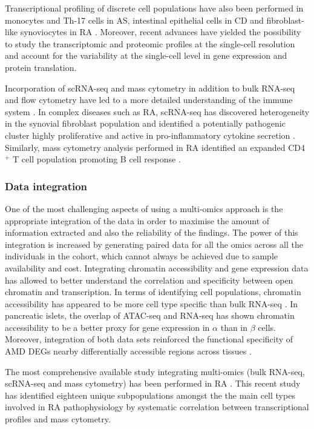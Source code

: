 Transcriptional profiling of discrete cell populations have also been performed in monocytes and Th-17 cells in AS, intestinal epithelial cells in CD and fibroblast-like synoviocytes in RA \parencite{Al-Mossawi2017,Smith2008, Howell2018, Ai2016}. Moreover, recent advances have yielded the possibility to study the transcriptomic and proteomic profiles at the single-cell resolution and account for the variability at the single-cell level in gene expression and protein translation. 

Incorporation of scRNA-seq and mass cytometry in addition to bulk RNA-seq and flow cytometry have led to a more detailed understanding of the immune system \parencite{Jaitin2014, Villani2017,Bengsch2018}. In complex diseases such as RA, scRNA-seq has discovered heterogeneity in the synovial fibroblast population and identified a potentially pathogenic cluster highly proliferative and active in pro-inflammatory cytokine secretion \parencite{Mizoguchi2018}. Similarly, mass cytometry analysis performed in RA identified an expanded CD4$^+$ T cell population promoting B cell response \parencite{Rao2017}.

\subsubsection{Data integration}

One of the most challenging aspects of using a multi-omics approach is the appropriate integration of the data in order to maximise the amount of information extracted and also the reliability of the findings. The power of this integration is increased by generating paired data for all the omics across all the individuals in the cohort, which cannot always be achieved due to sample availability and cost.  
Integrating chromatin accessibility and gene expression data has allowed to better understand the correlation and specificity between open chromatin and transcription. In terms of identifying cell populations, chromatin accessibility has appeared to be more cell type specific than bulk RNA-seq \parencite{Corces2016}. In pancreatic islets, the overlap of ATAC-seq and RNA-seq has shown chromatin accessibility to be a better proxy for gene expression in $\alpha$ than in $\beta$ cells. Moreover, integration of both data sets reinforced the functional specificity of AMD DEGs nearby differentially accessible regions across tissues \parencite{Ackermann2016, Wang2018}. 

The most comprehensive available study integrating multi-omics (bulk RNA-seq, scRNA-seq and mass cytometry) has been performed in RA \parencite{Zhang2018}. This recent study has identified eighteen unique subpopulations amongst the the main cell types involved in RA pathophysiology by systematic correlation between transcriptional profiles and mass cytometry.

